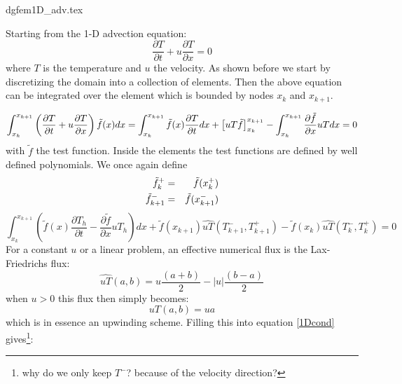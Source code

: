 \begin{flushright} {\tiny {\color{gray} dgfem1D\_adv.tex}} \end{flushright}

Starting from the 1-D advection equation:
\begin{equation}
    \frac{\partial T}{\partial t}+u\frac{\partial T}{\partial x}=0 
\end{equation}
where $T$ is the temperature and $u$ the velocity. 
As shown before we start by discretizing the domain into a collection of elements. 
Then the above equation can be integrated over the element which is bounded by nodes $x_k$ and $x_{k+1}$. 

\begin{equation}
\int_{x_k}^{x_{k+1}}  \left(\frac{\partial T}{\partial t}+u\frac{\partial T}{\partial x}\right) \tilde{f}(x) dx 
=
\int_{x_k}^{x_{k+1}} \tilde{f}(x)\frac{\partial T}{\partial t} dx
+\left[ uT \tilde{f}  \right]_{x_k}^{x_{k+1}}
-\int_{x_k}^{x_{k+1}} \frac{\partial \tilde{f}}{\partial x} uT dx
=0 \nonumber
\end{equation}
with $\tilde{f}$ the test function. 
Inside the elements the test functions are defined by well defined polynomials. 
We once again define
\begin{eqnarray}
\tilde{f}_k^+    &=&\tilde{f}(x_k^+) \nonumber\\
\tilde{f}_{k+1}^-&=&\tilde{f}(x_{k+1}^-)\nonumber
\end{eqnarray}
\begin{equation}
    \int_{x_k}^{x_{k+1}}\left(
    \tilde{f}(x)\frac{\partial T_h}{\partial t}-
    \frac{\partial \tilde{f}}{\partial x} uT_h \right) dx
    +\tilde{f}(x_{k+1})\widehat{uT}(T_{k+1}^-,T_{k+1}^+)
    -\tilde{f}(x_{k})\widehat{uT}(T_{k}^-,T_{k}^+)=0
    \label{1Dcond}
\end{equation}
For a constant $u$ or a linear problem, an effective numerical flux
is the Lax-Friedrichs flux:
\begin{equation}
\widehat{uT}(a,b)=u \frac{(a+b)}{2}-|u|\frac{(b-a)}{2}
\end{equation}
when $u>0$ this flux then simply becomes:
\begin{equation}
uT(a,b)=u a
\end{equation}
which is in essence an upwinding scheme.
Filling this into equation \eqref{1Dcond} gives\footnote{why do we only keep $T^-$? because 
of the velocity direction?}:
